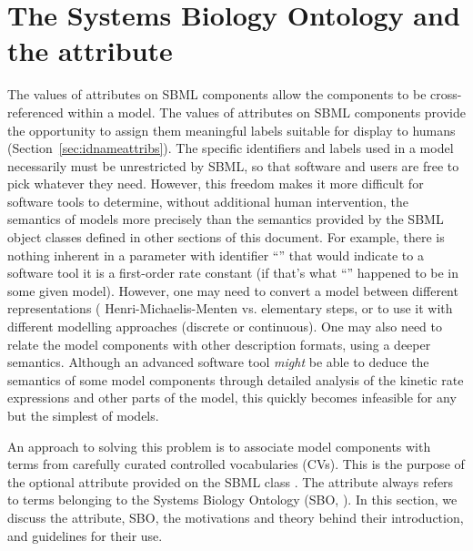 
\section{The Systems Biology Ontology and the  attribute}
\label{sec:sboTerm}
\label{sec:sbo}

The values of  attributes on SBML components
allow the components to be cross-referenced within a model. The
values of  attributes on SBML components
provide the opportunity to assign them meaningful labels
suitable for display to humans
(Section~\ref{sec:idnameattribs}).  The specific identifiers and
labels used in a model necessarily must be unrestricted by SBML,
so that software and users are free to pick whatever they need.
However, this freedom makes it more difficult for software tools
to determine, without additional human intervention, the semantics
of models more precisely than the semantics provided by the SBML
object classes defined in other sections of this document.  For
example, there is nothing inherent in a parameter with identifier
``'' that would indicate to a software tool it is a
first-order rate constant (if that's what ``'' happened
to be in some given model).  However, one may need to convert a
model between different representations (\eg
Henri-Michaelis-Menten vs. elementary steps, or to use it with
different modelling approaches (discrete or continuous).  One may
also need to relate the model components with other description
formats, using a deeper semantics.  Although an advanced software
tool \emph{might} be able to deduce the semantics of some model
components through detailed analysis of the kinetic rate expressions
and other parts of the model, this quickly becomes infeasible for
any but the simplest of models.

An approach to solving this problem is to associate model
components with terms from carefully curated controlled
vocabularies (CVs).  This is the purpose of the optional
 attribute provided on the SBML
class \SBase.  The  attribute always refers to
terms belonging to the Systems Biology Ontology (SBO, \sboref). In
this section, we discuss the  attribute,
SBO, the motivations and theory behind their introduction, and
guidelines for their use.

